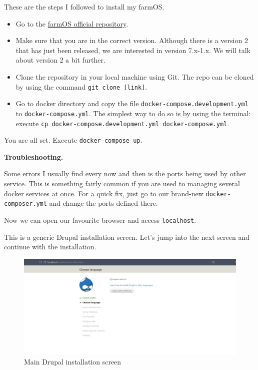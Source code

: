 \vspace{7mm}
These are the steps I followed to install my farmOS.
\begin{itemize}
    \item Go to the \href{https://github.com/farmOS/farmOS}{farmOS official repository}.
    \item Make sure that you are in the correct version. Although there is a version 2 that has just been released, we are interested in version 7.x-1.x. We will talk about version 2 a bit further.
    \item Clone the repository in your local machine using Git. The repo can be cloned by using the command \verb|git clone [link]|.
    \item Go to docker directory and copy the file \verb|docker-compose.development.yml| to \verb|docker-compose.yml|. The simplest way to do so is by using the terminal: execute \verb|cp docker-compose.development.yml docker-compose.yml|.
\end{itemize}

You are all set. Execute \verb|docker-compose up|.

\vspace{7mm}
\textbf{Troubleshooting.}

Some errors I usually find every now and then is the ports being used by other service. This is something fairly common if you are used to managing several docker services at once. For a quick fix, just go to our brand-new \verb|docker-composer.yml| and change the ports defined there.

\vspace{7mm}
Now we can open our favourite browser and access \verb|localhost|.

This is a generic Drupal installation screen. Let's jump into the next screen and continue with the installation.

\begin{figure}[H]
    \centering
    \includegraphics[width=1\textwidth]{fig/drupal-install/farmos-drupal-install.png}
    \caption{Main Drupal installation screen}
    \label{fig:farmos-drupal-install}
\end{figure}

